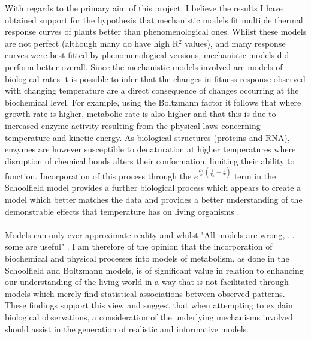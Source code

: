 \documentclass[11pt]{article}
\begin{document}
With regards to the primary aim of this project, I believe the results I have obtained support for the hypothesis that mechanistic models fit multiple thermal response curves of plants better than phenomenological ones. Whilst these models are not perfect (although many do have high R\begin{math}^2\end{math} values), and many response curves were best fitted by phenomenological versions, mechanistic models did perform better overall. Since the mechanistic models involved are models of biological rates it is possible to infer that the changes in fitness response observed with changing temperature are a direct consequence of changes occurring at the biochemical level. For example, using the Boltzmann factor it follows that where growth rate is higher, metabolic rate is also higher and that this is due to increased enzyme activity resulting from the physical laws concerning temperature and kinetic energy. As biological structures (proteins and RNA), enzymes are however susceptible to denaturation at higher temperatures where disruption of chemical bonds alters their conformation, limiting their ability to function. Incorporation of this process through the \begin{math}e^{\frac{E_h}{k}(\frac{1}{T_h} - \frac{1}{T})}\end{math} term in the Schoolfield model provides a further biological process which appears to create a model which better matches the data and provides a better understanding of the demonstrable effects that temperature has on living organisms \cite{martin2008suboptimal}.   
\\
\\
Models can only ever approximate reality and whilst "All models are wrong, ... some are useful" \cite{box1987empirical}. I am therefore of the opinion that the incorporation of biochemical and physical processes into models of metabolism, as done in the Schoolfield and Boltzmann models, is of significant value in relation to enhancing our understanding of the living world in a way that is not facilitated through models which merely find statistical associations between observed patterns. These findings support this view and  suggest that when attempting to explain biological observations, a consideration of the underlying mechanisms involved should assist in the generation of realistic and informative models. 
\\
\\
\end{document}
